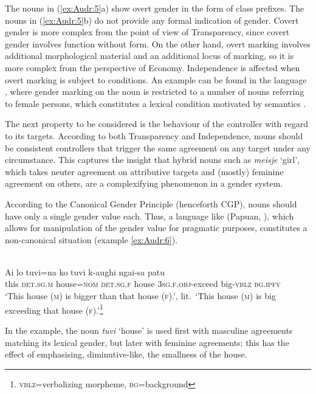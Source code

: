 \documentclass[output=collectionpaper]{langsci/langscibook}
\begin{document}
The nouns in (\ref{ex:Audr:5}a) show overt gender in the form of class prefixes. The nouns in (\ref{ex:Audr:5}b) do not provide any formal indication of gender. Covert gender is more complex from the point of view of Transparency, since covert gender involves function without form. On the other hand, overt marking involves additional morphological material and an additional locus of marking, so it is more complex from the perspective of Economy. Independence is affected when overt marking is subject to conditions. An example can be found in the  language , where gender marking on the noun is restricted to a number of nouns referring to female persons, which constitutes a lexical condition motivated by semantics \citep[57]{Steeman2011}.

The next property to be considered is the behaviour of the controller with regard to its targets. According to both Transparency and Independence, nouns should be consistent controllers that trigger the same agreement on any target under any circumstance. This captures the insight that hybrid nouns such as  \textit{meisje} `girl', which takes neuter agreement on attributive targets and (mostly) feminine agreement on others, are a complexifying phenomenon in a gender system.

According to the Canonical Gender Principle (henceforth CGP), nouns should have only a single gender value each. Thus, a language like  (Papuan, \citealt{Wegener2012}), which allows for manipulation of the gender value for pragmatic purposes, constitutes a non-canonical situation (example \ref{ex:Audr:6}).

\ea
\label{ex:Audr:6}
 \citep[64]{Wegener2012}\\
\gll Ai lo tuvi=na ko tuvi k-aughi ngai-sa patu\\
     this \textsc{det.sg.m} house=\textsc{nom} \textsc{det.sg.f} house \textsc{3sg.f.obj}{}-exceed big-\textsc{vblz} \textsc{bg.ipfv}\\
\glt `This house (\textsc{m}) is bigger than that house (\textsc{f}).', lit.\ `This house (\textsc{m}) is big exceeding that house (\textsc{f}).'\footnote{\textsc{vblz}=verbalizing morpheme, \textsc{bg}=background}
\z

In the example, the noun \textit{tuvi} `house' is used first with masculine agreements matching its lexical gender, but later with feminine agreements; this has the effect of emphasising, diminutive-like, the smallness of the house.
\end{document}

